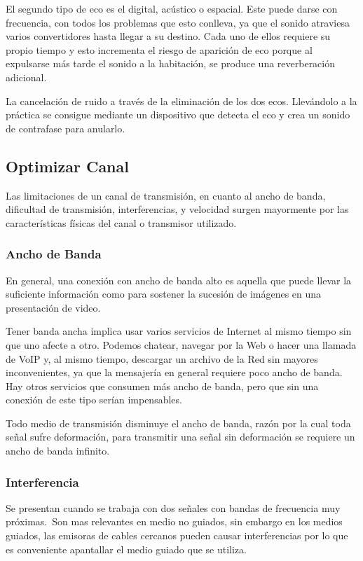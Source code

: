 \documentclass[a4paper]{article}
\begin{document}
El segundo tipo de eco es el digital, acústico o espacial. Este puede
darse con frecuencia, con todos los problemas que esto conlleva, ya que
el sonido atraviesa varios convertidores hasta llegar a su destino. Cada
uno de ellos requiere su propio tiempo y esto incrementa el riesgo de
aparición de eco porque al expulsarse más tarde el sonido a la
habitación, se produce una reverberación adicional.

La cancelación de ruido a través de la eliminación de los dos ecos.
Llevándolo a la práctica se consigue mediante un dispositivo que detecta
el eco y crea un sonido de contrafase para anularlo.

\subsection{Optimizar Canal}

Las limitaciones de un canal de transmisión, en cuanto al ancho de
banda, dificultad de transmisión, interferencias, y velocidad surgen
mayormente por las características físicas del canal o transmisor
utilizado.

\subsubsection{Ancho de Banda}

En general, una conexión con ancho de banda alto es aquella que puede
llevar la suficiente información como para sostener la sucesión de
imágenes en una presentación de video.

Tener banda ancha implica usar varios servicios de Internet al mismo
tiempo sin que uno afecte a otro. Podemos chatear, navegar por la Web o
hacer una llamada de VoIP y, al mismo tiempo, descargar un archivo de la
Red sin mayores inconvenientes, ya que la mensajería en general requiere
poco ancho de banda. Hay otros servicios que consumen más ancho de
banda, pero que sin una conexión de este tipo serían impensables.

Todo medio de transmisión disminuye el ancho de banda, razón por la cual
toda señal sufre deformación, para transmitir una señal sin deformación
se requiere un ancho de banda infinito.

\subsubsection{Interferencia}

Se presentan cuando se trabaja con dos señales con bandas de frecuencia
muy próximas.~Son mas relevantes en medio no guiados, sin embargo en los
medios guiados, las emisoras de cables cercanos pueden causar
interferencias por lo que es conveniente apantallar el medio guiado que
se utiliza.
\end{document}
